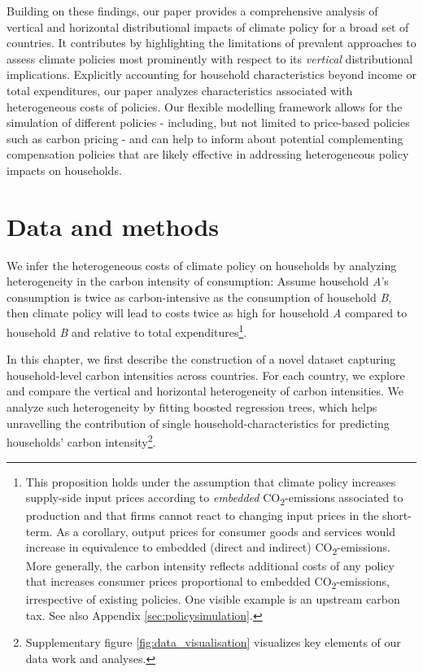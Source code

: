\documentclass[12pt, a4paper]{article}
\begin{document}
Building on these findings, our paper provides a comprehensive analysis of vertical and horizontal distributional impacts of climate policy for a broad set of countries. It contributes by highlighting the limitations of prevalent approaches to assess climate policies most prominently with respect to its \textit{vertical} distributional implications. Explicitly accounting for household characteristics beyond income or total expenditures, our paper analyzes characteristics associated with heterogeneous costs of policies. Our flexible modelling framework allows for the simulation of different policies - including, but not limited to price-based policies such as carbon pricing - and can help to inform about potential complementing compensation policies that are likely effective in addressing heterogeneous policy impacts on households.

\section{Data and methods} \label{sec:data_methods}

We infer the heterogeneous costs of climate policy on households by analyzing heterogeneity in the carbon intensity of consumption: Assume household \textit{A}'s consumption is twice as carbon-intensive as the consumption of household \textit{B}, then climate policy will lead to costs twice as high for household \textit{A} compared to household \textit{B} and relative to total expenditures\footnote{This proposition holds under the assumption that climate policy increases supply-side input prices according to \textit{embedded} CO\textsubscript{2}-emissions associated to production and that firms cannot react to changing input prices in the short-term. As a corollary, output prices for consumer goods and services would increase in equivalence to embedded (direct and indirect) CO\textsubscript{2}-emissions. More generally, the carbon intensity reflects additional costs of any policy that increases consumer prices proportional to embedded CO\textsubscript{2}-emissions, irrespective of existing policies. One visible example is an upstream carbon tax. See also Appendix \ref{sec:policysimulation}.}.

In this chapter, we first describe the construction of a novel dataset capturing household-level carbon intensities across countries. For each country, we explore and compare the vertical and horizontal heterogeneity of carbon intensities. We analyze such heterogeneity by fitting boosted regression trees, which helps unravelling the contribution of single household-characteristics for predicting households' carbon intensity\footnote{Supplementary figure \ref{fig:data_visualisation} visualizes key elements of our data work and analyses.}.
\end{document}
